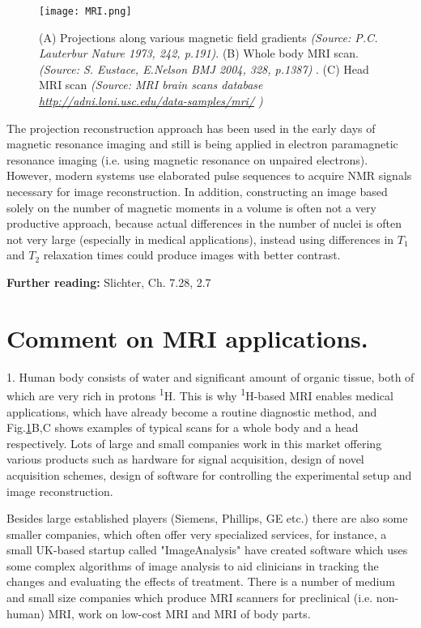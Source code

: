 \documentclass[a4paper, 12pt]{article}
\begin{document}
\begin{figure}[ht]
\caption{(A) Projections along various magnetic field gradients \textit{(Source: P.C. Lauterbur Nature 1973, 242, p.191)}. (B) Whole body MRI scan. \textit{(Source: S. Eustace, E.Nelson BMJ 2004, 328, p.1387) }. (C) Head MRI scan \textit{(Source: MRI brain scans database \url{http://adni.loni.usc.edu/data-samples/mri/} )} }
\label{fig:MRI}
\centering
\texttt{[image: MRI.png]}
\end{figure}

  The projection reconstruction approach has been used in the early days of magnetic resonance imaging and still is being applied in electron paramagnetic resonance imaging (i.e. using magnetic resonance on unpaired electrons). However, modern systems use elaborated pulse sequences to acquire NMR signals necessary for image reconstruction.
  In addition, constructing an image based solely on the number of magnetic moments in a volume is often not a very productive approach, because actual differences in the number of nuclei is often not very large (especially in medical applications), instead using differences in $T_1$ and $T_2$ relaxation times could produce images with better contrast.
  
\textbf{Further reading:} Slichter, Ch. 7.28, 2.7
  
  
\section{Comment on MRI applications.}
  1. Human body consists of water and significant amount of organic tissue, both of which are very rich in protons \textsuperscript{1}H. This is why \textsuperscript{1}H-based MRI enables medical applications, which have already become a routine diagnostic method, and Fig.\ref{fig:MRI}B,C shows examples of typical scans for a whole body and a head respectively. Lots of large and small companies work in this market offering various products such as hardware for signal acquisition, design of novel acquisition schemes, design of software for controlling the experimental setup and image reconstruction.
  
  Besides large established players (Siemens, Phillips, GE etc.) there are also some smaller companies, which often offer very specialized services, for instance, a small UK-based startup called "ImageAnalysis" have created software which uses some complex algorithms of image analysis to aid clinicians in tracking the changes and evaluating the effects of treatment.
  There is a number of medium and small size companies which produce MRI scanners for preclinical (i.e. non-human) MRI, work on low-cost MRI and MRI of body parts. 
\end{document}
